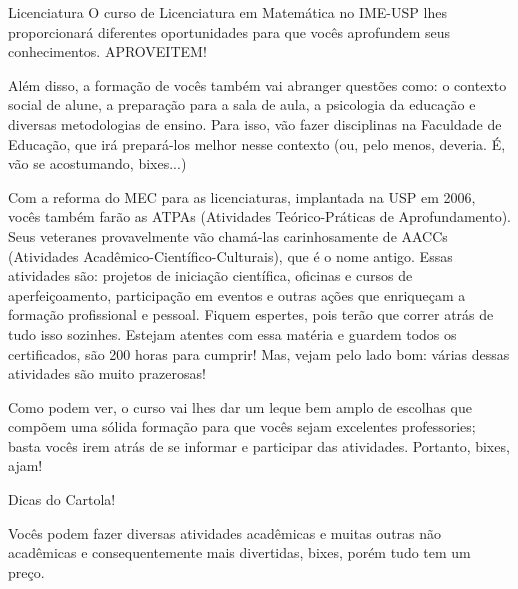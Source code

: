 \begin{subsecao}{Licenciatura}
O curso de Licenciatura em Matemática no IME-USP lhes proporcionará diferentes oportunidades para
que vocês aprofundem seus conhecimentos. APROVEITEM!

Além disso, a formação de vocês também vai abranger questões como: o contexto
social de alune, a preparação para a sala de aula, a psicologia da educação e
diversas metodologias de ensino. Para isso, vão fazer disciplinas na
Faculdade de Educação, que irá prepará-los melhor nesse contexto (ou, pelo
menos, deveria. É, vão se acostumando, bixes...)

Com a reforma do MEC para as licenciaturas, implantada na USP em 2006,
vocês também farão as ATPAs (Atividades Teórico-Práticas de Aprofundamento).
Seus veteranes provavelmente vão chamá-las carinhosamente de AACCs (Atividades
Acadêmico-Científico-Culturais), que é o nome antigo. Essas atividades são:
projetos de iniciação científica, oficinas e cursos de aperfeiçoamento,
participação em eventos e outras ações que enriqueçam a formação profissional e
pessoal. Fiquem espertes, pois terão que correr atrás de tudo isso sozinhes.
Estejam atentes com essa matéria e guardem todos os certificados, são 200 horas para cumprir! 
Mas, vejam pelo lado bom: várias dessas atividades são muito prazerosas!

Como podem ver, o curso vai lhes dar um leque bem amplo de escolhas que
compõem uma sólida formação para que vocês sejam excelentes professories; basta 
vocês irem atrás de se informar e participar das atividades. Portanto, bixes, ajam!

\begin{subsubsecao}{Dicas do Cartola!}

Vocês podem fazer diversas atividades acadêmicas e muitas outras não acadêmicas e
consequentemente mais divertidas, bixes, porém tudo tem um preço.


\end{subsubsecao}
\end{subsecao}
